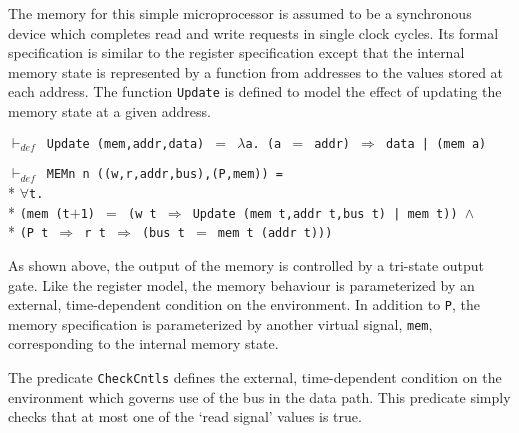 \begin{normalsize}
The memory for this simple microprocessor is assumed to be
a synchronous device which completes read and write requests
in single clock cycles.
Its formal specification is similar to the register specification
except that the internal memory state is represented by a function
from addresses to the values stored at each address.
The function \verb"Update" is defined to model the effect of
updating the memory state at a given address.

$\vdash_{def}$\verb" Update (mem,addr,data) "$=$\verb" "$\lambda$\verb"a. (a "$=$\verb" addr) "$\Rightarrow$\verb" data | (mem a)"

\hspace*{\fill}
\begin{minipage}{17cm}
$\vdash_{def}$\verb" MEMn n ((w,r,addr,bus),(P,mem)) ="\\*
$\forall$\verb"t."\\*
\verb"(mem (t"$+$\verb"1) "$=$\verb" (w t "$\Rightarrow$\verb" Update (mem t,addr t,bus t) | mem t)) "$\wedge$\\*
\verb"(P t "$\Longrightarrow$\verb" r t "$\Longrightarrow$\verb" (bus t "$=$\verb" mem t (addr t)))"
\end{minipage}
\hspace*{\fill}

As shown above, the output of the memory is controlled by a
tri-state output gate.
Like the register model,
the memory behaviour is parameterized by an external, time-dependent
condition on the environment.
In addition to \verb"P", the memory specification is
parameterized by another virtual signal, \verb"mem", corresponding to the
internal memory state.

The predicate \verb"CheckCntls" defines the external, time-dependent
condition on the environment which governs use of the bus in the data path.
This predicate simply checks that at most one of the `read signal'
values is true.


\end{normalsize}
